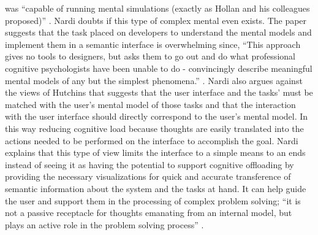 \documentclass{sig-alternate}
\begin{document}
was ``capable of running mental simulations (exactly as Hollan and his
colleagues proposed)'' \cite{Nardi:BeyondModels}. Nardi doubts if this type of
complex mental even exists. The paper suggests that the task placed on
developers to understand the mental models and implement them in a semantic
interface is overwhelming  since, ``This approach gives no tools to designers,
but asks them to go out and do what professional cognitive psychologists have
been unable to do - convincingly describe meaningful mental models of any but
the simplest phenomena.'' \cite{Nardi:BeyondModels}. Nardi also argues against
the views of Hutchins \cite{Hutchins:1985:DirectManipulationIinterfaces} that
suggests that the user interface and the tasks' must be matched with the user's
mental model of those tasks and that the interaction with the user interface
should directly correspond to the user's mental model. In this way reducing
cognitive load because thoughts are easily translated into the actions needed to
be performed on the interface to accomplish the goal. Nardi explains that this
type of view limits the interface to a simple means to an ends instead of seeing
it as having the potential to support cognitive offloading by providing the
necessary visualizations for quick and accurate transference of semantic
information about the system and the tasks at hand. It can help guide the user
and support them in the processing of complex problem solving; ``it is not a
passive receptacle for thoughts emanating from an internal model, but plays an active
role in the problem solving process'' \cite{Nardi:BeyondModels}. 
 
\end{document}
